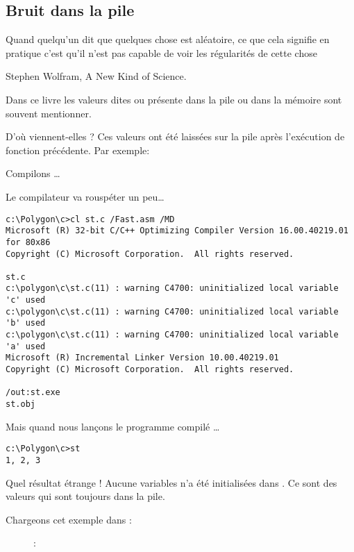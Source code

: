 \subsection{Bruit dans la pile}
\label{bruit_dans_la_pile}

\epigraph{Quand quelqu'un dit que quelques chose est aléatoire,
  ce que cela signifie en pratique c'est qu'il n'est pas capable de
  voir les régularités de cette chose}{Stephen Wolfram, A New Kind of Science.}

Dans ce livre les valeurs dites  ou  présente dans la pile ou dans la mémoire sont souvent mentionner.

D'où viennent-elles ?
Ces valeurs ont été laissées sur la pile après l'exécution de fonction précédente.
Par exemple: 



Compilons \dots



Le compilateur va rouspéter un peu\dots 

\begin{lstlisting}
c:\Polygon\c>cl st.c /Fast.asm /MD
Microsoft (R) 32-bit C/C++ Optimizing Compiler Version 16.00.40219.01 for 80x86
Copyright (C) Microsoft Corporation.  All rights reserved.

st.c
c:\polygon\c\st.c(11) : warning C4700: uninitialized local variable 'c' used
c:\polygon\c\st.c(11) : warning C4700: uninitialized local variable 'b' used
c:\polygon\c\st.c(11) : warning C4700: uninitialized local variable 'a' used
Microsoft (R) Incremental Linker Version 10.00.40219.01
Copyright (C) Microsoft Corporation.  All rights reserved.

/out:st.exe
st.obj
\end{lstlisting}

Mais quand nous lançons le programme compilé \dots

\begin{lstlisting}
c:\Polygon\c>st
1, 2, 3
\end{lstlisting}

Quel résultat étrange ! Aucune variables n'a été initialisées dans .
Ce sont des valeurs  qui sont toujours dans la pile.

\clearpage
Chargeons cet exemple dans \olly:

\begin{figure}[H]
\centering
{}
\caption{\olly: }
\label{fig:stack_noise_olly1}
\end{figure}

